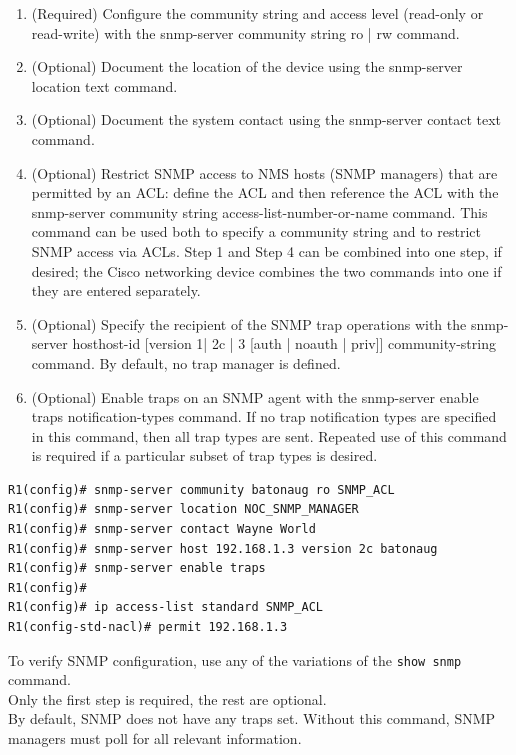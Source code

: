 \begin{enumerate}
\item (Required) Configure the community string and access level (read-only or read-write) with the snmp-server community string ro | rw command.

\item (Optional) Document the location of the device using the snmp-server location text command.

\item (Optional) Document the system contact using the snmp-server contact text command.

\item (Optional) Restrict SNMP access to NMS hosts (SNMP managers) that are permitted by an ACL: define the ACL and then reference the ACL with the snmp-server community string access-list-number-or-name command. This command can be used both to specify a community string and to restrict SNMP access via ACLs. Step 1 and Step 4 can be combined into one step, if desired; the Cisco networking device combines the two commands into one if they are entered separately.

\item (Optional) Specify the recipient of the SNMP trap operations with the snmp-server hosthost-id [version {1| 2c | 3 [auth | noauth | priv]}] community-string command. By default, no trap manager is defined.

\item (Optional) Enable traps on an SNMP agent with the snmp-server enable traps notification-types command. If no trap notification types are specified in this command, then all trap types are sent. Repeated use of this command is required if a particular subset of trap types is desired.
\end{enumerate}

\begin{verbatim}
R1(config)# snmp-server community batonaug ro SNMP_ACL
R1(config)# snmp-server location NOC_SNMP_MANAGER
R1(config)# snmp-server contact Wayne World
R1(config)# snmp-server host 192.168.1.3 version 2c batonaug
R1(config)# snmp-server enable traps
R1(config)# 
R1(config)# ip access-list standard SNMP_ACL
R1(config-std-nacl)# permit 192.168.1.3
\end{verbatim}

\note To verify SNMP configuration, use any of the variations of the \texttt{show snmp} command.\\ \note Only the first step is required, the rest are optional.\\
\note By default, SNMP does not have any traps set. Without this command, SNMP managers must poll for all relevant information. 

